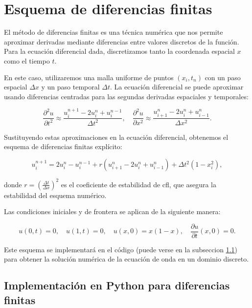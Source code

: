\section{Esquema de diferencias finitas}

El método de diferencias finitas es una técnica numérica que nos permite aproximar derivadas mediante diferencias entre valores discretos de la función. Para la ecuación diferencial dada, discretizamos tanto la coordenada espacial $x$ como el tiempo $t$.

En este caso, utilizaremos una malla uniforme de puntos $(x_i, t_n)$ con un paso espacial $\Delta x$ y un paso temporal $\Delta t$. La ecuación diferencial se puede aproximar usando diferencias centradas para las segundas derivadas espaciales y temporales:

\begin{equation}\label{eq:aprox_derivadas_centradas}
    \frac{\partial^2 u}{\partial t^2} \approx \frac{u^{n+1}_i - 2u^n_i + u^{n-1}_i}{\Delta t^2}, \quad \frac{\partial^2 u}{\partial x^2} \approx \frac{u^n_{i+1} - 2u^n_i + u^n_{i-1}}{\Delta x^2}.
\end{equation}

Sustituyendo estas aproximaciones en la ecuación diferencial, obtenemos el esquema de diferencias finitas explícito:

\begin{equation}\label{eq:dif_finitas}
    u^{n+1}_i = 2u^n_i - u^{n-1}_i + r \left( u^n_{i+1} - 2u^n_i + u^n_{i-1} \right) + \Delta t^2 (1 - x_i^2),
\end{equation}

donde $r = \left( \frac{\Delta t}{\Delta x} \right)^2$ es el coeficiente de estabilidad de \gls{cfl}, que asegura la estabilidad del esquema numérico.

Las condiciones iniciales y de frontera se aplican de la siguiente manera:

\begin{equation}\label{eq:condiciones_dif_finitas}
    u(0, t) = 0, \quad u(1, t) = 0, \quad u(x, 0) = x(1 - x), \quad \frac{\partial u}{\partial t}(x, 0) = 0.
\end{equation}

Este esquema se implementará en el código (puede verse en la subseccion \ref{implementacion_dif_finitas_python}) para obtener la solución numérica de la ecuación de onda en un dominio discreto.

\subsection{Implementación en Python para diferencias finitas}\label{implementacion_dif_finitas_python}

